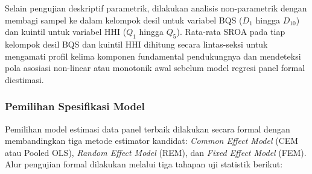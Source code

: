 \documentclass[12pt,a4paper]{article}
\begin{document}
Selain pengujian deskriptif parametrik, dilakukan analisis
non-parametrik dengan membagi sampel ke dalam kelompok desil untuk
variabel BQS (\(D_1\) hingga \(D_{10}\)) dan kuintil untuk variabel HHI
(\(Q_1\) hingga \(Q_5\)). Rata-rata SROA pada tiap kelompok desil BQS
dan kuintil HHI dihitung secara lintas-seksi untuk mengamati profil
kelima komponen fundamental pendukungnya dan mendeteksi pola asosiasi
non-linear atau monotonik awal sebelum model regresi panel formal
diestimasi.

\subsubsection{Pemilihan Spesifikasi
Model}\label{pemilihan-spesifikasi-model}

Pemilihan model estimasi data panel terbaik dilakukan secara formal
dengan membandingkan tiga metode estimator kandidat: \emph{Common Effect
Model} (CEM atau Pooled OLS), \emph{Random Effect Model} (REM), dan
\emph{Fixed Effect Model} (FEM). Alur pengujian formal dilakukan melalui
tiga tahapan uji statistik berikut:
\end{document}
